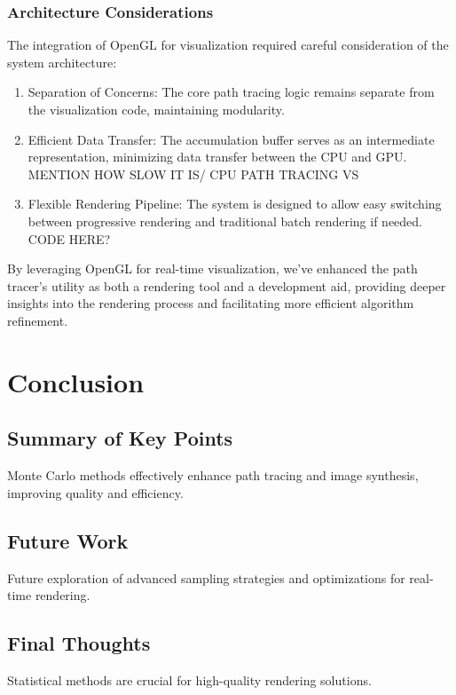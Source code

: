 \documentclass[12pt]{article}
\begin{document}
\subsubsection{Architecture Considerations}

The integration of OpenGL for visualization required careful consideration of the system architecture:

\begin{enumerate}
    \item Separation of Concerns: The core path tracing logic remains separate from the visualization code, maintaining modularity.
    \item Efficient Data Transfer: The accumulation buffer serves as an intermediate representation, minimizing data transfer between the CPU and GPU. MENTION HOW SLOW IT IS/ CPU PATH TRACING VS
    \item Flexible Rendering Pipeline: The system is designed to allow easy switching between progressive rendering and traditional batch rendering if needed. CODE HERE?
\end{enumerate}

By leveraging OpenGL for real-time visualization, we've enhanced the path tracer's utility as both a rendering tool and a development aid, providing deeper insights into the rendering process and facilitating more efficient algorithm refinement.

\section{Conclusion}
\label{sec:conclusion}
\subsection{Summary of Key Points}
Monte Carlo methods effectively enhance path tracing and image synthesis, improving quality and efficiency.

\subsection{Future Work}
Future exploration of advanced sampling strategies and optimizations for real-time rendering.

\subsection{Final Thoughts}
Statistical methods are crucial for high-quality rendering solutions.
\end{document}
